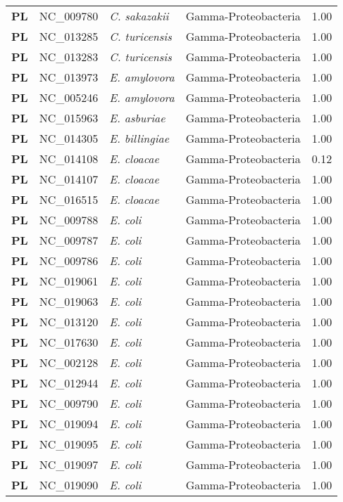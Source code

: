 \begin{adjustwidth}{-3cm}{2cm}
{\begin{supertabular}{>{\bfseries}l|p{0.1\textwidth}p{0.14\textwidth}l|l}
PL & NC\_009780 & \textit{C. sakazakii} & Gamma-Proteobacteria & 1.00\\
PL & NC\_013285 & \textit{C. turicensis} & Gamma-Proteobacteria & 1.00\\
PL & NC\_013283 & \textit{C. turicensis} & Gamma-Proteobacteria & 1.00\\
PL & NC\_013973 & \textit{E. amylovora} & Gamma-Proteobacteria & 1.00\\
PL & NC\_005246 & \textit{E. amylovora} & Gamma-Proteobacteria & 1.00\\
PL & NC\_015963 & \textit{E. asburiae} & Gamma-Proteobacteria & 1.00\\
PL & NC\_014305 & \textit{E. billingiae} & Gamma-Proteobacteria & 1.00\\
PL & NC\_014108 & \textit{E. cloacae} & Gamma-Proteobacteria & 0.12\\
PL & NC\_014107 & \textit{E. cloacae} & Gamma-Proteobacteria & 1.00\\
PL & NC\_016515 & \textit{E. cloacae} & Gamma-Proteobacteria & 1.00\\
PL & NC\_009788 & \textit{E. coli} & Gamma-Proteobacteria & 1.00\\
PL & NC\_009787 & \textit{E. coli} & Gamma-Proteobacteria & 1.00\\
PL & NC\_009786 & \textit{E. coli} & Gamma-Proteobacteria & 1.00\\
PL & NC\_019061 & \textit{E. coli} & Gamma-Proteobacteria & 1.00\\
PL & NC\_019063 & \textit{E. coli} & Gamma-Proteobacteria & 1.00\\
PL & NC\_013120 & \textit{E. coli} & Gamma-Proteobacteria & 1.00\\
PL & NC\_017630 & \textit{E. coli} & Gamma-Proteobacteria & 1.00\\
PL & NC\_002128 & \textit{E. coli} & Gamma-Proteobacteria & 1.00\\
PL & NC\_012944 & \textit{E. coli} & Gamma-Proteobacteria & 1.00\\
PL & NC\_009790 & \textit{E. coli} & Gamma-Proteobacteria & 1.00\\
PL & NC\_019094 & \textit{E. coli} & Gamma-Proteobacteria & 1.00\\
PL & NC\_019095 & \textit{E. coli} & Gamma-Proteobacteria & 1.00\\
PL & NC\_019097 & \textit{E. coli} & Gamma-Proteobacteria & 1.00\\
PL & NC\_019090 & \textit{E. coli} & Gamma-Proteobacteria & 1.00\\

\end{supertabular}}
\end{adjustwidth}
